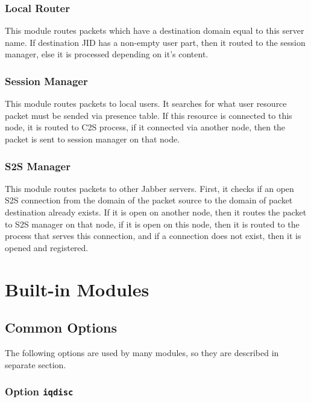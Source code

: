\documentclass[10pt]{article}
\newcommand{\Jabber}{Jabber}
\begin{document}
\subsubsection{Local Router}

This module routes packets which have a destination domain equal to this server
name.  If destination JID has a non-empty user part, then it routed to the
session manager, else it is processed depending on it's content.


\subsubsection{Session Manager}

This module routes packets to local users.  It searches for what user resource
packet must be sended via presence table.  If this resource is connected to
this node, it is routed to C2S process, if it connected via another node, then
the packet is sent to session manager on that node.


\subsubsection{S2S Manager}

This module routes packets to other \Jabber{} servers.  First, it checks if an
open S2S connection from the domain of the packet source to the domain of
packet destination already exists. If it is open on another node, then it
routes the packet to S2S manager on that node, if it is open on this node, then
it is routed to the process that serves this connection, and if a connection
does not exist, then it is opened and registered.



\appendix{}

\section{Built-in Modules}
\label{sec:modules}

\subsection{Common Options}
\label{sec:modcommonopts}

The following options are used by many modules, so they are described in
separate section.

\subsubsection{Option \texttt{iqdisc}}
\end{document}
